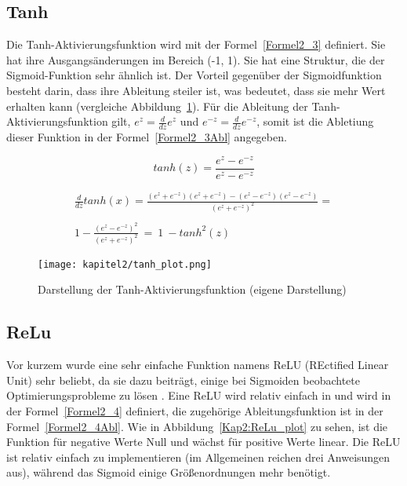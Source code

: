 \subsection{Tanh}
Die Tanh-Aktivierungsfunktion wird mit der Formel~\ref{Formel2_3} definiert. Sie hat ihre Ausgangsänderungen im Bereich (-1, 1). Sie hat eine Struktur, die der Sigmoid-Funktion sehr ähnlich ist. Der Vorteil gegenüber der Sigmoidfunktion besteht darin, dass ihre Ableitung steiler ist, was bedeutet, dass sie mehr Wert erhalten kann (vergleiche Abbildung~\ref{Kap2:Tanh_plot}). Für die Ableitung der Tanh-Aktivierungsfunktion gilt, $e^z = \frac{d}{dz}e^z$ und $e^{-z} = \frac{d}{dz}e^{-z}$, somit ist die Abletiung dieser Funktion in der Formel~\ref{Formel2_3Abl} angegeben.

\begin{equation} \label{Formel2_3}
    tanh(z) = \frac{e^{z}-e^{-z}}{e^{z}-e^{-z}}
\end{equation}

\begin{equation} \label{Formel2_3Abl}
    \begin{array}{ c }
        \frac{d}{dz} tanh( x) =\frac{\left( e^{z} +e^{-z}\right)\left( e^{z} +e^{-z}\right) -\left( e^{z} -e^{-z}\right)\left( e^{z} -e^{-z}\right)}{\left( e^{z} +e^{-z}\right)^{2}} = \\
        \\
        1-\frac{\left( e^{z} -e^{-z}\right)^{2}}{\left( e^{z} +e^{-z}\right)^{2}} \ =\ 1\ -tanh^{2}( z)
    \end{array}
\end{equation}

\begin{figure}[H]
    \centering
    \texttt{[image: kapitel2/tanh\_plot.png]}
    \caption[Darstellung der Tanh-Aktivierungsfunktion]{Darstellung der Tanh-Aktivierungsfunktion (eigene Darstellung)}
    \label{Kap2:Tanh_plot}
\end{figure}

\subsection{ReLu}
Vor kurzem wurde eine sehr einfache Funktion namens ReLU (REctified Linear Unit) sehr beliebt, da sie dazu beiträgt, einige bei Sigmoiden beobachtete Optimierungsprobleme zu lösen \cite*[11]{AntonioGuili;AmitaKapoor;SujitPal2019}. Eine ReLU wird relativ einfach in und wird in der Formel~\ref{Formel2_4} definiert, die zugehörige Ableitungsfunktion ist in der Formel~\ref{Formel2_4Abl}. Wie in Abbildung~\ref{Kap2:ReLu_plot} zu sehen, ist die Funktion für negative Werte Null und wächst für positive Werte linear. Die ReLU ist relativ einfach zu implementieren (im Allgemeinen reichen drei Anweisungen aus), während das Sigmoid einige Größenordnungen mehr benötigt.

